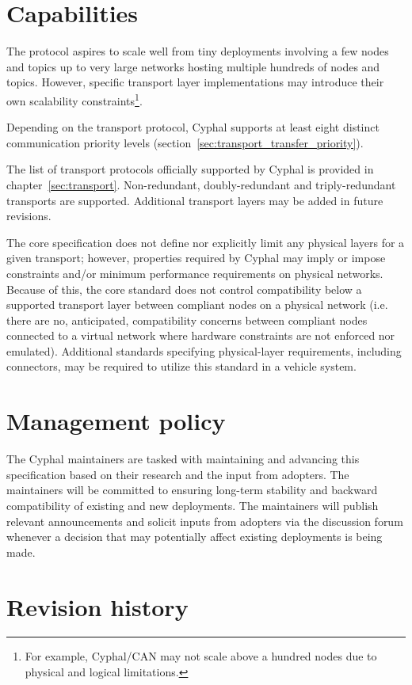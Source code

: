 \section{Capabilities}

The protocol aspires to scale well from tiny deployments involving a few nodes and topics
up to very large networks hosting multiple hundreds of nodes and topics.
However, specific transport layer implementations may introduce their own scalability constraints\footnote{%
    For example, Cyphal/CAN may not scale above a hundred nodes due to physical and logical limitations.
}.

Depending on the transport protocol, Cyphal supports at least eight distinct communication priority levels
(section~\ref{sec:transport_transfer_priority}).

The list of transport protocols officially supported by Cyphal is provided in chapter~\ref{sec:transport}.
Non-redundant, doubly-redundant and triply-redundant transports are supported.
Additional transport layers may be added in future revisions.

The core specification does not define nor explicitly limit any physical layers for a given transport; however,
properties required by Cyphal may imply or impose constraints and/or minimum performance requirements on physical
networks. Because of this, the core standard does not control compatibility below a supported transport layer between
compliant nodes on a physical network (i.e. there are no, anticipated, compatibility concerns between compliant nodes
connected to a virtual network where hardware constraints are not enforced nor emulated).
Additional standards specifying physical-layer requirements, including connectors,
may be required to utilize this standard in a vehicle system.

\section{Management policy}

The Cyphal maintainers are tasked with maintaining and advancing this specification
based on their research and the input from adopters.
The maintainers will be committed to ensuring long-term stability and backward compatibility of
existing and new deployments.
The maintainers will publish relevant announcements and solicit inputs from adopters
via the discussion forum whenever a decision that may potentially affect existing deployments is being made.

\section{Revision history}

